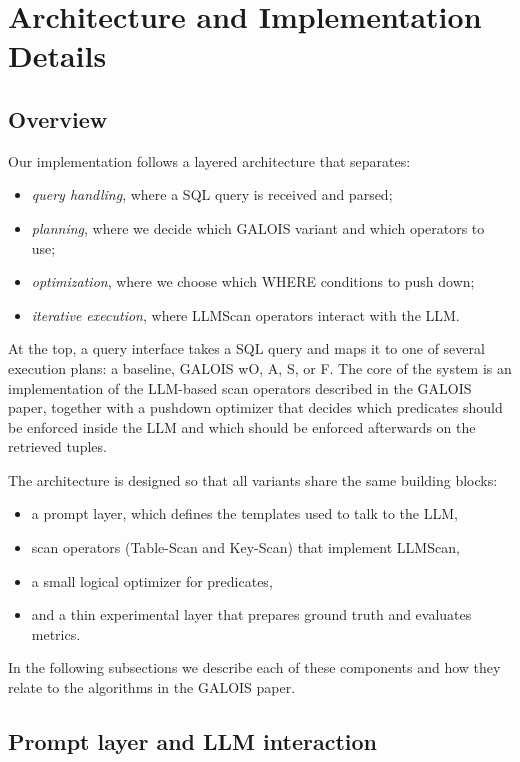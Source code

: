 \documentclass[11pt]{article}
\begin{document}
\section{Architecture and Implementation Details}
\label{sec:architecture}

\subsection{Overview}

Our implementation follows a layered architecture that separates:

\begin{itemize}
  \item \emph{query handling}, where a SQL query is received and parsed;
  \item \emph{planning}, where we decide which GALOIS variant and which operators to use;
  \item \emph{optimization}, where we choose which WHERE conditions to push down;
  \item \emph{iterative execution}, where LLMScan operators interact with the LLM.
\end{itemize}

At the top, a query interface takes a SQL query and maps it to one of several execution
plans: a baseline, GALOIS wO, A, S, or F. The core of the system is an implementation
of the LLM-based scan operators described in the GALOIS paper, together with a
pushdown optimizer that decides which predicates should be enforced inside the LLM
and which should be enforced afterwards on the retrieved tuples.

The architecture is designed so that all variants share the same building blocks:

\begin{itemize}
  \item a prompt layer, which defines the templates used to talk to the LLM,
  \item scan operators (Table-Scan and Key-Scan) that implement LLMScan,
  \item a small logical optimizer for predicates,
  \item and a thin experimental layer that prepares ground truth and evaluates metrics.
\end{itemize}

In the following subsections we describe each of these components and how they relate
to the algorithms in the GALOIS paper.

\subsection{Prompt layer and LLM interaction}
\end{document}
